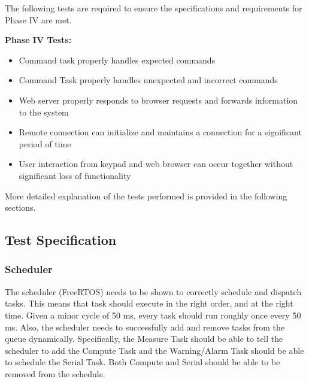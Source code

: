 \documentclass[12pt]{article} %
\begin{document}
		The following tests are required to ensure the specifications and
		requirements for Phase IV are met.

		\textbf{Phase IV Tests:}
		\begin{itemize}
			\item Command task properly handles expected commands
			\item Command Task properly handles unexpected and incorrect commands
			\item Web server properly responds to browser requests and forwards information to the system
			\item Remote connection can initialize and maintains a connection for a significant period of time
			\item User interaction from keypad and web browser can occur together without significant loss of functionality
		\end{itemize}
    More detailed explanation of the tests performed is provided in the
    following sections.
    
    \subsection{Test Specification} 

%

    \subsubsection{Scheduler}
    The scheduler (FreeRTOS) needs to be shown to correctly schedule and dispatch tasks.
    This means that task should execute in the right order, and at the right
    time. Given a minor cycle of 50 ms, every task should run roughly once
    every 50 ms.   Also, the scheduler needs to successfully add and remove
    tasks from the queue dynamically.  Specifically, the Measure Task
    should be able to tell the scheduler to add the Compute Task and the
    Warning/Alarm Task should be able to schedule the Serial Task.  Both
    Compute and Serial should be able to be removed from the schedule.
\end{document}
